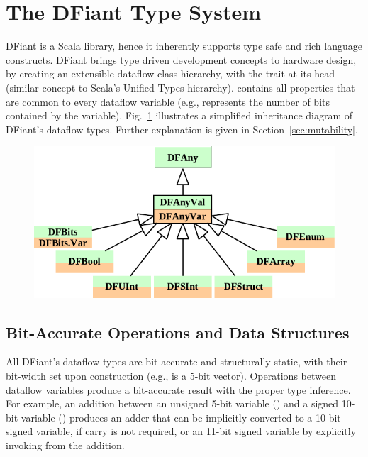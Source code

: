 \section{The DFiant Type System}
\label{sec:type_system}
DFiant is a Scala library, hence it inherently supports type safe and rich language constructs. DFiant brings type driven development concepts to hardware design, by creating an extensible dataflow class hierarchy, with the trait  at its head (similar concept to Scala's Unified Types hierarchy).  contains all properties that are common to every dataflow variable (e.g.,  represents the number of bits contained by the variable). Fig.~\ref{fig:Inherit} illustrates a simplified inheritance diagram of DFiant's dataflow types. Further explanation is given in Section~\ref{sec:mutability}. 

\begin{figure}[h]
	\centering
	\includegraphics[scale=0.7]{graphics/Inherit.pdf} 
	\label{fig:Inherit}
\end{figure}



\subsection{Bit-Accurate Operations and Data Structures}
All DFiant's dataflow types are bit-accurate and structurally static, with their bit-width set upon construction (e.g.,  is a 5-bit vector). Operations between dataflow variables produce a bit-accurate result with the proper type inference. For example, an addition between an unsigned 5-bit variable () and a signed 10-bit variable () produces an adder that can be implicitly converted to a 10-bit signed variable, if carry is not required, or an 11-bit signed variable by explicitly invoking  from the addition.

